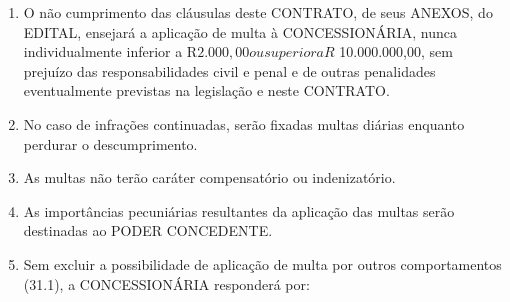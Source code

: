 \documentclass[a4paper,11pt]{report} %
\begin{document}
\begin{enumerate}
\item \label{itm:JXXF} O não cumprimento das cláusulas deste CONTRATO, de seus ANEXOS, do EDITAL, ensejará a aplicação de multa à CONCESSIONÁRIA, nunca individualmente inferior a R$ 2.000,00 ou superior a R$ 10.000.000,00, sem prejuízo das responsabilidades civil e penal e de outras penalidades eventualmente previstas na legislação e neste CONTRATO. 

\item \label{itm:FKHY} No caso de infrações continuadas, serão fixadas multas diárias enquanto perdurar o descumprimento.

\item \label{itm:76MX} As multas não terão caráter compensatório ou indenizatório.

\item \label{itm:7TQZ} As importâncias pecuniárias resultantes da aplicação das multas serão destinadas ao PODER CONCEDENTE. 

\item \label{itm:M6RE} Sem excluir a possibilidade de aplicação de multa por outros comportamentos (31.1), a CONCESSIONÁRIA responderá por:

\end{enumerate}
\end{document}
